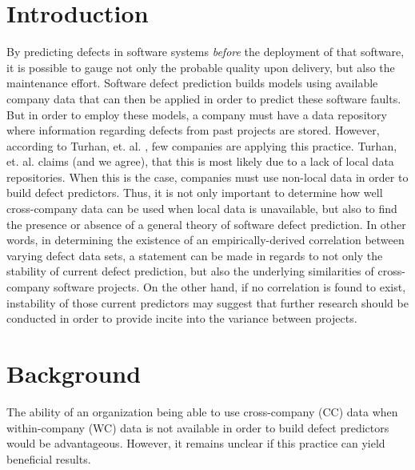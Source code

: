 \documentclass{sig-alternate}
\begin{document}
\section{Introduction} 
By predicting defects in software systems {\em before} the deployment of that software, 
it is possible to gauge not only the probable quality upon delivery, but also the maintenance effort. 
Software defect prediction builds models using available company data that can then be applied in order 
to predict these software faults. But in order to employ these models, a company must have 
a data repository where information regarding defects from past projects are stored. 
However, according to Turhan, et. al. \cite{turhan09}, few companies are applying this practice. 
Turhan, et. al. claims (and we agree), that this is most likely due to a lack of local data repositories.
When this is the case, companies must use non-local data in order to build defect predictors. Thus, 
it is not only important to determine how well cross-company data can be used when local data is unavailable, 
but also to find the presence or absence of a general theory of software defect prediction. In other words, 
in determining the existence of an empirically-derived correlation between varying defect data sets, 
a statement can be made in regards to not only the stability of current defect prediction, but also the 
underlying similarities of cross-company software projects. On the other hand, 
if no correlation is found to exist, instability of those current predictors may suggest that further research 
should be conducted in order to provide incite into the variance between projects. 


\section{Background}

The ability of an organization being able to use cross-company (CC) data 
when within-company (WC) data is not available in order to build 
defect predictors would be advantageous. However, it remains unclear 
if this practice can yield beneficial results.  
	
\end{document}
